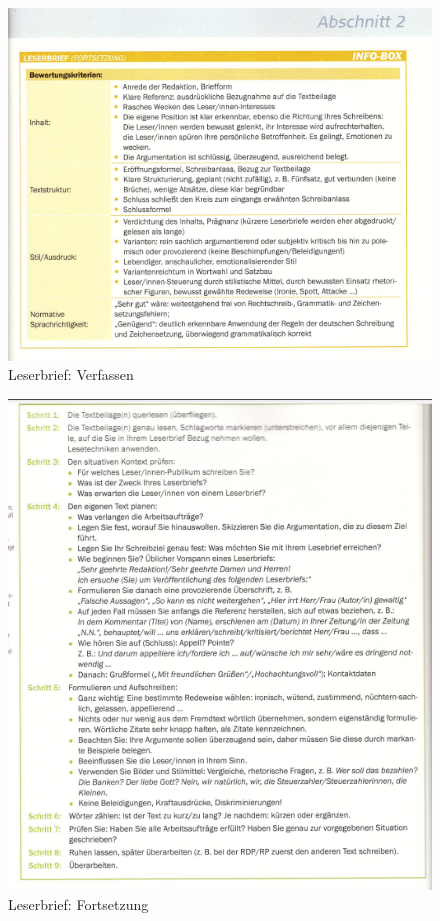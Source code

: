 \begin{figure}[h]
    \centering
    \includegraphics[scale=0.8]{./pics/Screenshot from 2023-02-06 12-28-55.png}
    \caption{Leserbrief: Verfassen}
    \label{fig:impl:Leserbrief2}
\end{figure}
\begin{figure}[h]
    \centering
    \includegraphics[scale=0.8]{./pics/Screenshot from 2023-02-06 12-29-05.png}
    \caption{Leserbrief: Fortsetzung}
    \label{fig:impl:Leserbrief3}
\end{figure}
